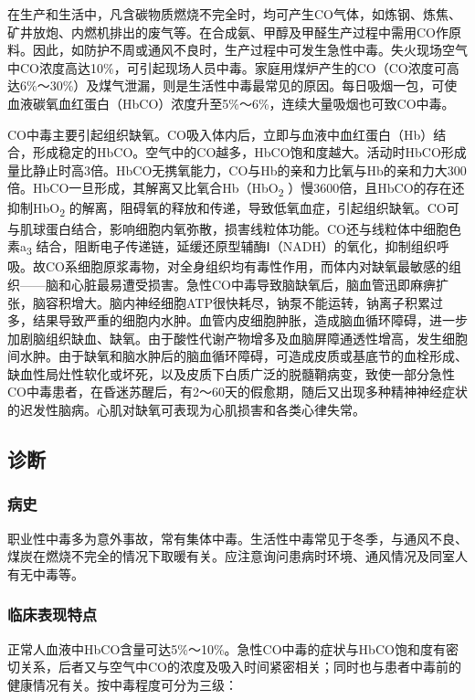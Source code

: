 在生产和生活中，凡含碳物质燃烧不完全时，均可产生CO气体，如炼钢、炼焦、矿井放炮、内燃机排出的废气等。在合成氨、甲醇及甲醛生产过程中需用CO作原料。因此，如防护不周或通风不良时，生产过程中可发生急性中毒。失火现场空气中CO浓度高达10\%，可引起现场人员中毒。家庭用煤炉产生的CO（CO浓度可高达6\%～30\%）及煤气泄漏，则是生活性中毒最常见的原因。每日吸烟一包，可使血液碳氧血红蛋白（HbCO）浓度升至5\%～6\%，连续大量吸烟也可致CO中毒。

CO中毒主要引起组织缺氧。CO吸入体内后，立即与血液中血红蛋白（Hb）结合，形成稳定的HbCO。空气中的CO越多，HbCO饱和度越大。活动时HbCO形成量比静止时高3倍。HbCO无携氧能力，CO与Hb的亲和力比氧与Hb的亲和力大300倍。HbCO一旦形成，其解离又比氧合Hb（HbO\textsubscript{2}
）慢3600倍，且HbCO的存在还抑制HbO\textsubscript{2}
的解离，阻碍氧的释放和传递，导致低氧血症，引起组织缺氧。CO可与肌球蛋白结合，影响细胞内氧弥散，损害线粒体功能。CO还与线粒体中细胞色素a\textsubscript{3}
结合，阻断电子传递链，延缓还原型辅酶Ⅰ（NADH）的氧化，抑制组织呼吸。故CO系细胞原浆毒物，对全身组织均有毒性作用，而体内对缺氧最敏感的组织------脑和心脏最易遭受损害。急性CO中毒导致脑缺氧后，脑血管迅即麻痹扩张，脑容积增大。脑内神经细胞ATP很快耗尽，钠泵不能运转，钠离子积累过多，结果导致严重的细胞内水肿。血管内皮细胞肿胀，造成脑血循环障碍，进一步加剧脑组织缺血、缺氧。由于酸性代谢产物增多及血脑屏障通透性增高，发生细胞间水肿。由于缺氧和脑水肿后的脑血循环障碍，可造成皮质或基底节的血栓形成、缺血性局灶性软化或坏死，以及皮质下白质广泛的脱髓鞘病变，致使一部分急性CO中毒患者，在昏迷苏醒后，有2～60天的假愈期，随后又出现多种精神神经症状的迟发性脑病。心肌对缺氧可表现为心肌损害和各类心律失常。

\subsection{诊断}

\subsubsection{病史}

职业性中毒多为意外事故，常有集体中毒。生活性中毒常见于冬季，与通风不良、煤炭在燃烧不完全的情况下取暖有关。应注意询问患病时环境、通风情况及同室人有无中毒等。

\subsubsection{临床表现特点}

正常人血液中HbCO含量可达5\%～10\%。急性CO中毒的症状与HbCO饱和度有密切关系，后者又与空气中CO的浓度及吸入时间紧密相关；同时也与患者中毒前的健康情况有关。按中毒程度可分为三级：


